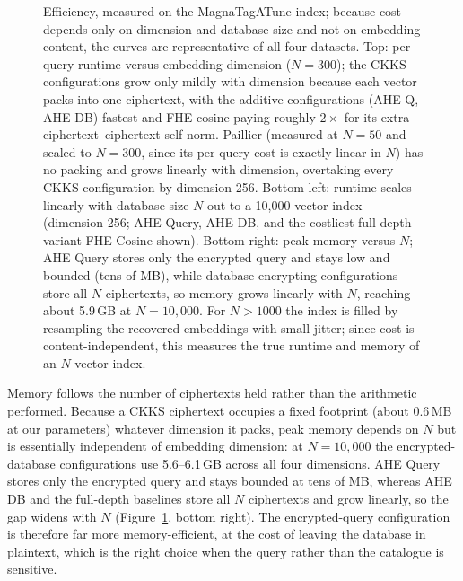 \documentclass[sigconf,nonacm]{acmart}
\begin{document}
\begin{figure}[t]
\caption{Efficiency, measured on the MagnaTagATune index; because cost depends only on dimension and database size and not on embedding content, the curves are representative of all four datasets. Top: per-query runtime versus embedding dimension ($N{=}300$); the CKKS configurations grow only mildly with dimension because each vector packs into one ciphertext, with the additive configurations (AHE Q, AHE DB) fastest and FHE cosine paying roughly $2\times$ for its extra ciphertext--ciphertext self-norm. Paillier (measured at $N{=}50$ and scaled to $N{=}300$, since its per-query cost is exactly linear in $N$) has no packing and grows linearly with dimension, overtaking every CKKS configuration by dimension 256. Bottom left: runtime scales linearly with database size $N$ out to a 10{,}000-vector index (dimension 256; AHE Query, AHE DB, and the costliest full-depth variant FHE Cosine shown). Bottom right: peak memory versus $N$; AHE Query stores only the encrypted query and stays low and bounded (tens of MB), while database-encrypting configurations store all $N$ ciphertexts, so memory grows linearly with $N$, reaching about 5.9\,GB at $N{=}10{,}000$. For $N>1000$ the index is filled by resampling the recovered embeddings with small jitter; since cost is content-independent, this measures the true runtime and memory of an $N$-vector index.}
\label{fig:eff}
\end{figure}

Memory follows the number of ciphertexts held rather than the arithmetic performed. Because a CKKS ciphertext occupies a fixed footprint (about 0.6\,MB at our parameters) whatever dimension it packs, peak memory depends on $N$ but is essentially independent of embedding dimension: at $N{=}10{,}000$ the encrypted-database configurations use 5.6--6.1\,GB across all four dimensions. AHE Query stores only the encrypted query and stays bounded at tens of MB, whereas AHE DB and the full-depth baselines store all $N$ ciphertexts and grow linearly, so the gap widens with $N$ (Figure~\ref{fig:eff}, bottom right). The encrypted-query configuration is therefore far more memory-efficient, at the cost of leaving the database in plaintext, which is the right choice when the query rather than the catalogue is sensitive.
\end{document}
